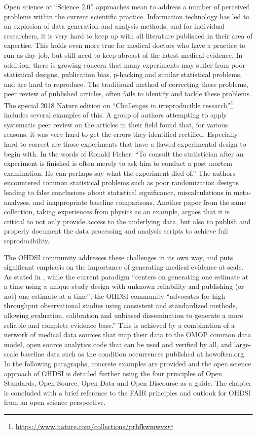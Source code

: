 \documentclass[11pt]{book}
\let\rmarkdownfootnote\footnote%
\def\footnote{\protect\rmarkdownfootnote}
\theoremstyle{definition}
\theoremstyle{definition}
\theoremstyle{definition}
\theoremstyle{remark}
\begin{document}
Open science or ``Science 2.0'' \citep{wiki:Science_2.0} approaches mean to address a number of perceived problems within the current scientific practice. Information technology has led to an explosion of data generation and analysis methods, and for individual researchers, it is very hard to keep up with all literature published in their area of expertise. This holds even more true for medical doctors who have a practice to run as day job, but still need to keep abreast of the latest medical evidence. In addition, there is growing concern that many experiments may suffer from poor statistical designs, publication bias, p-hacking and similar statistical problems, and are hard to reproduce. The traditional method of correcting these problems, peer review of published articles, often fails to identify and tackle these problems. The special 2018 Nature edition on ``Challenges in irreproducible research''\footnote{\url{https://www.nature.com/collections/prbfkwmwvz}} includes several examples of this. A group of authors attempting to apply systematic peer review on the articles in their field found that, for various reasons, it was very hard to get the errors they identified rectified. Especially hard to correct are those experiments that have a flawed experimental design to begin with. In the words of Ronald Fisher: ``To consult the statistician after an experiment is finished is often merely to ask him to conduct a post mortem examination. He can perhaps say what the experiment died of.'' \citep{wikiquote:Ronald_Fisher} The authors encountered common statistical problems such as poor randomization designs leading to false conclusions about statistical significance, miscalculations in meta-analyses, and inappropriate baseline comparisons. \citep{allison_2016} Another paper from the same collection, taking experiences from physics as an example, argues that it is critical to not only provide access to the underlying data, but also to publish and properly document the data processing and analysis scripts to achieve full reproducibility. \citep{Chen2018}

The OHDSI community addresses these challenges in its own way, and puts significant emphasis on the importance of generating medical evidence at scale. As stated in \citet{schuemie_2018b}, while the current paradigm ``centers on generating one estimate at a time using a unique study design with unknown reliability and publishing (or not) one estimate at a time'', the OHDSI community ``advocates for high-throughput observational studies using consistent and standardized methods, allowing evaluation, calibration and unbiased dissemination to generate a more reliable and complete evidence base.'' This is achieved by a combination of a network of medical data sources that map their data to the OMOP common data model, open source analytics code that can be used and verified by all, and large-scale baseline data such as the condition occurrences published at howoften.org. In the following paragraphs, concrete examples are provided and the open science approach of OHDSI is detailed further using the four principles of Open Standards, Open Source, Open Data and Open Discourse as a guide. The chapter is concluded with a brief reference to the FAIR principles and outlook for OHDSI from an open science perspective.
\end{document}
